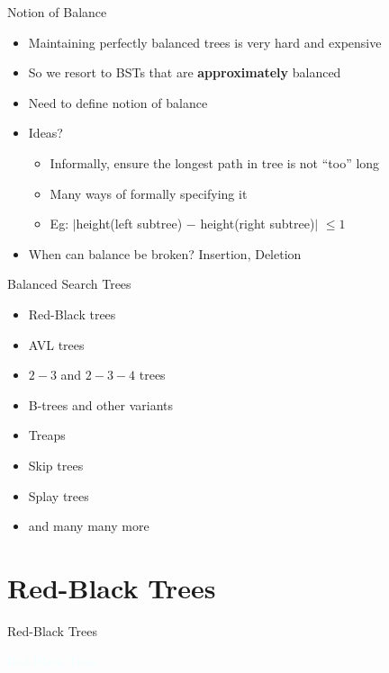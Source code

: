 \documentclass{beamer}
\newcommand{\thblue}[1]{{\Huge {\textcolor{azure}{#1}}}}
\begin{document}
\begin{frame}{Notion of Balance}
    \begin{itemize}
        \item Maintaining perfectly balanced trees is very hard and expensive
        \item So we resort to BSTs that are {\bf approximately} balanced
        \item Need to define notion of balance
        \item Ideas? \pause
        \begin{itemize}
            \item Informally, ensure the longest path in tree is not ``too'' long
            \item Many ways of formally specifying it
            \item Eg: $|$height(left subtree) $-$ height(right subtree)$|$ $\leq 1$ 
        \end{itemize}
        \item When can balance be broken? \pause Insertion, Deletion
    \end{itemize}
\end{frame}


\begin{frame}{Balanced Search Trees}
    \begin{itemize}
        \item Red-Black trees
        \item AVL trees
        \item $2-3$ and $2-3-4$ trees
        \item B-trees and other variants
        \item Treaps
        \item Skip trees
        \item Splay trees
        \item and many many more
    \end{itemize}
\end{frame}

\section{Red-Black Trees}
\begin{frame}{Red-Black Trees}
    \begin{center}
        \thblue{Red-Black Trees}
    \end{center}
\end{frame}
\end{document}
